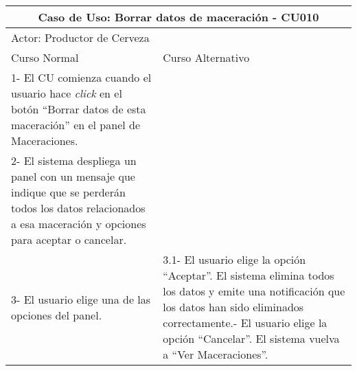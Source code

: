     
    \begin{minipage}{0.95\textwidth}
    \begin{center}
    \begin{tabularx}{\textwidth}{ | X | X |}
        \hline
        \multicolumn{2}{|c|}{\textbf{Caso de Uso: Borrar datos de maceración - CU010}} \\
        \hline
        \multicolumn{2}{|l|}{Actor: Productor de Cerveza} \\
        \hline
        Curso Normal & Curso Alternativo \\
        \hline
        1- El CU comienza cuando el usuario hace \textit{click} en el botón “Borrar datos de esta maceración” en el panel de Maceraciones. & \\
        \hline
        2- El sistema despliega un panel con un mensaje que indique que se perderán todos los datos relacionados a esa maceración y opciones para aceptar o cancelar. &
        \\
        \hline
        3- El usuario elige una de las opciones del panel. & 3.1- El usuario elige la opción “Aceptar”. El sistema elimina todos los datos y emite una notificación que los datos han sido eliminados correctamente.\newline
        3.2- El usuario elige la opción “Cancelar”. El sistema vuelva a “Ver Maceraciones”.
        \\
        \hline
    \end{tabularx}
    \label{CU010}
    \end{center}
    \end{minipage}
    
